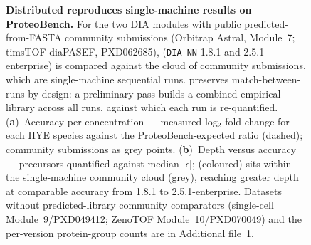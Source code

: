 \begin{figure}[htbp]
  \centering
  \caption[quantmsdiann reproduces single-machine ProteoBench submissions]{%
    \textbf{Distributed \quantmsdiann{} reproduces single-machine results on
    ProteoBench.} For the two DIA modules with public predicted-from-FASTA
    community submissions (Orbitrap Astral, Module~7; timsTOF diaPASEF,
    PXD062685), \quantmsdiann{} (\texttt{DIA-NN} 1.8.1 and 2.5.1-enterprise) is
    compared against the cloud of community submissions, which are
    single-machine sequential runs. \quantmsdiann{} preserves
    match-between-runs by design: a preliminary pass builds a combined
    empirical library across all runs, against which each run is re-quantified.
    (\textbf{a})~Accuracy per concentration --- measured log$_2$ fold-change for
    each HYE species against the ProteoBench-expected ratio (dashed); community
    submissions as grey points.
    (\textbf{b})~Depth versus accuracy --- precursors quantified against
    median-$|\epsilon|$; \quantmsdiann{} (coloured) sits within the
    single-machine community cloud (grey), reaching greater depth at comparable
    accuracy from 1.8.1 to 2.5.1-enterprise.
    Datasets without predicted-library community comparators (single-cell
    Module~9/PXD049412; ZenoTOF Module~10/PXD070049) and the per-version
    protein-group counts are in Additional file~1.
  }
  \label{fig:proteobench}
\end{figure}

